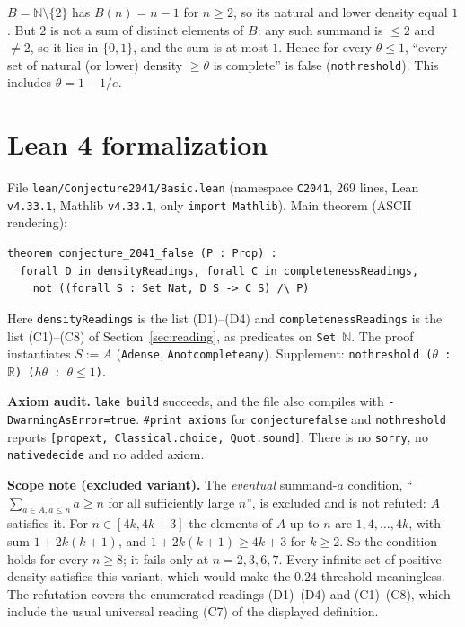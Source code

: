 \documentclass[11pt]{article}
\theoremstyle{definition}
\renewcommand{\_}{\oldus\allowbreak}
\begin{document}
$B=\mathbb{N}\setminus\{2\}$ has $B(n)=n-1$ for $n\ge2$, so its natural and lower density equal $1$. But
$2$ is not a sum of distinct elements of $B$: any such summand is $\le2$ and $\ne2$, so it lies in
$\{0,1\}$, and the sum is at most $1$. Hence for every $\theta\le1$, ``every set of natural (or lower)
density $\ge\theta$ is complete'' is false (\texttt{no\_threshold}). This includes $\theta=1-1/e$.

\section{Lean 4 formalization}\label{sec:lean}

File \texttt{lean/Conjecture2041/Basic.lean} (namespace \texttt{C2041}, 269 lines, Lean
\texttt{v4.33.1}, Mathlib \texttt{v4.33.1}, only \texttt{import Mathlib}). Main theorem (ASCII
rendering):
\begin{verbatim}
theorem conjecture_2041_false (P : Prop) :
  forall D in densityReadings, forall C in completenessReadings,
    not ((forall S : Set Nat, D S -> C S) /\ P)
\end{verbatim}
Here \texttt{densityReadings} is the list (D1)--(D4) and \texttt{completenessReadings} is the list
(C1)--(C8) of Section~\ref{sec:reading}, as predicates on \texttt{Set~$\mathbb{N}$}. The proof
instantiates $S:=A$ (\texttt{A\_dense}, \texttt{A\_not\_complete\_any}). Supplement:
\texttt{no\_threshold ($\theta$ : $\mathbb{R}$) ($h\theta$ : $\theta\le1$)}.

\textbf{Axiom audit.} \texttt{lake build} succeeds, and the file also compiles with
\texttt{-DwarningAsError=true}. \texttt{\#print axioms} for \texttt{conjecture\_2041\_false} and
\texttt{no\_threshold} reports \texttt{[propext, Classical.choice, Quot.sound]}. There is no
\texttt{sorry}, no \texttt{native\_decide} and no added axiom.

\textbf{Scope note (excluded variant).} The \emph{eventual} summand-$a$ condition,
``$\sum_{a\in A,a\le n}a\ge n$ for all sufficiently large $n$'', is excluded and is not refuted: $A$
satisfies it. For $n\in[4k,4k+3]$ the elements of $A$ up to $n$ are $1,4,\dots,4k$, with sum
$1+2k(k+1)$, and $1+2k(k+1)\ge4k+3$ for $k\ge2$. So the condition holds for every $n\ge8$; it fails
only at $n=2,3,6,7$. Every infinite set of positive density satisfies this variant, which would make
the $0.24$ threshold meaningless. The refutation covers the enumerated readings (D1)--(D4) and
(C1)--(C8), which include the usual universal reading (C7) of the displayed definition.
\end{document}
